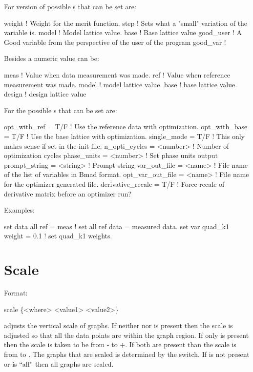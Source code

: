 For  version of  possible 
s that can be set are:
\begin{example}
  weight     ! Weight for the merit function.
  step       ! Sets what a "small" variation of the variable is.
  model      ! Model lattice value.
  base       ! Base lattice value
  good_user  ! A Good variable from the perspective of the user of the \tao program
  good_var   ! 
\end{example}
Besides a numeric value  can be:
\begin{example}
  meas        ! Value when data measurement was made.
  ref         ! Value when reference measurement was made.
  model       ! model lattice value.
  base        ! base lattice value.
  design      ! design lattice value
\end{example}

For  the possible 
s that can be set are:
\begin{example}
  opt_with_ref      = T/F      ! Use the reference data with optimization.
  opt_with_base     = T/F      ! Use the base lattice with optimization.
  single_mode       = T/F      ! This only makes sense if set in the init file.
  n_opti_cycles     = <number> ! Number of optimization cycles
  phase_units       = <number> ! Set phase units output
  prompt_string     = <string> ! Prompt string
  var_out_file      = <name>   ! File name of the list of variables in Bmad format. 
  opt_var_out_file  = <name>   ! File name for the optimizer generated file.
  derivative_recalc = T/F      ! Force recalc of derivative matrix before an optimizer run?
\end{example}

Examples:
\begin{example}
  set data all ref = meas       ! set all ref data = measured data.
  set var quad\_k1 weight = 0.1 ! set quad\_k1 weights. 
\end{example}

\section{Scale}
\label{s:scale}

Format:
\begin{example}
  scale \{<where> <value1> <value2>\}
\end{example}

\vskip 0.2in 
 adjusts the vertical scale of graphs. If neither
 nor  is present then the scale is adjusted
so that all the data points are within the graph region.  If only
 is present then the scale is taken to be from
- to +. If both are present than the scale
is from  to .  The graphs that are scaled is
determined by the  switch. If  is not present
or  is ``all'' then all graphs are scaled.

